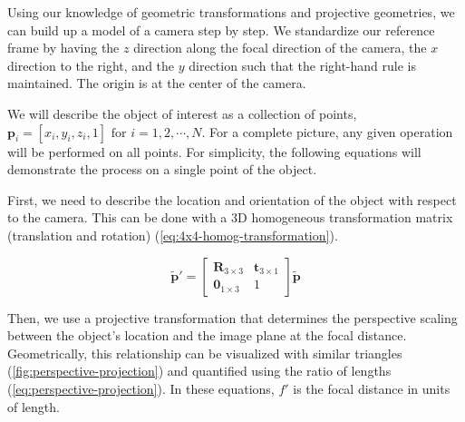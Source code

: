 Using our knowledge of geometric transformations and projective geometries, we can build up a model of a camera step by step.
We standardize our reference frame by having the $z$ direction along the focal direction of the camera, the $x$ direction to the right, and the $y$ direction such that the right-hand rule is maintained.
The origin is at the center of the camera.

We will describe the object of interest as a collection of points, $\mathbf{p}_i =  [x_i, y_i, z_i, 1] \text{ for } i = 1,2,\cdots,N$.
For a complete picture, any given operation will be performed on all points.
For simplicity, the following equations will demonstrate the process on a single point of the object.

First, we need to describe the location and orientation of the object with respect to the camera.
This can be done with a 3D homogeneous transformation matrix (translation and rotation) (\cref{eq:4x4-homog-transformation}).

\begin{equation}
    \tilde{\mathbf{p}}' = \begin{bmatrix}
        \mathbf{R}_{3 \times 3} & \mathbf{t}_{3 \times 1} \\ \mathbf{0}_{1 \times 3} & 1
    \end{bmatrix} \tilde{\mathbf{p}}
    \label{eq:4x4-homog-transformation}
\end{equation}

Then, we use a projective transformation that determines the perspective scaling between the object's location and the image plane at the focal distance.
Geometrically, this relationship can be visualized with similar triangles (\cref{fig:perspective-projection}) and quantified using the ratio of lengths (\cref{eq:perspective-projection}).
In these equations, $f'$ is the focal distance in units of length.

